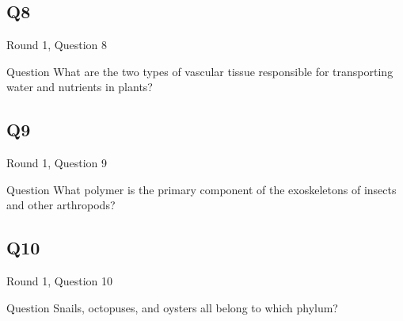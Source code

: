 \documentclass[11pt]{beamer}
\begin{document}
\subsection*{Q8}
\begin{frame}[t]{Round 1, Question 8}
\begin{block}{Question}
What are the two types of vascular tissue responsible for transporting water and nutrients in plants?
\end{block}
\end{frame}
\subsection*{Q9}
\begin{frame}[t]{Round 1, Question 9}
\begin{block}{Question}
What polymer is the primary component of the exoskeletons of insects and other arthropods?
\end{block}
\end{frame}
\subsection*{Q10}
\begin{frame}[t]{Round 1, Question 10}
\begin{block}{Question}
Snails, octopuses, and oysters all belong to which phylum?
\end{block}
\end{frame}
\end{document}
